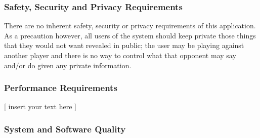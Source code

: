 \documentclass[twoside,letterpaper]{article}
\begin{document}
\subsubsection{Safety, Security and Privacy Requirements}
There are no inherent safety, security or privacy requirements of this application.  As a precaution however, all users of the system should keep private those things that they would not want revealed in public; the user may be playing against another player and there is no way to control what that opponent may say and/or do given any private information.

\subsubsection{Performance Requirements}



[ insert your text here ] %

\subsubsection{System and Software Quality}
\end{document}
